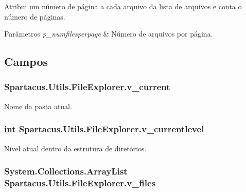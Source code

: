 Atribui um número de página a cada arquivo da lista de arquivos e conta o número de páginas. 


\begin{DoxyParams}{Parâmetros}
{\em p\+\_\+numfilesperpage} & Número de arquivos por página.\\
\hline
\end{DoxyParams}


\subsection{Campos}
\hypertarget{classSpartacus_1_1Utils_1_1FileExplorer_a3b9d61aefae4f495fcc4709783671472}{
\subsubsection[{v\+\_\+current}]{ Spartacus.\+Utils.\+File\+Explorer.\+v\+\_\+current}}\label{classSpartacus_1_1Utils_1_1FileExplorer_a3b9d61aefae4f495fcc4709783671472}


Nome da pasta atual. 

\hypertarget{classSpartacus_1_1Utils_1_1FileExplorer_a3622a3fd986d0685ce13c5fe0ebb2c3b}{
\subsubsection[{v\+\_\+currentlevel}]{\setlength{\rightskip}{0pt plus 5cm}int Spartacus.\+Utils.\+File\+Explorer.\+v\+\_\+currentlevel}}\label{classSpartacus_1_1Utils_1_1FileExplorer_a3622a3fd986d0685ce13c5fe0ebb2c3b}


Nível atual dentro da estrutura de diretórios. 

\hypertarget{classSpartacus_1_1Utils_1_1FileExplorer_a94c423e8e9df914fb225b740e4829b11}{
\subsubsection[{v\+\_\+files}]{\setlength{\rightskip}{0pt plus 5cm}System.\+Collections.\+Array\+List Spartacus.\+Utils.\+File\+Explorer.\+v\+\_\+files}}\label{classSpartacus_1_1Utils_1_1FileExplorer_a94c423e8e9df914fb225b740e4829b11}


